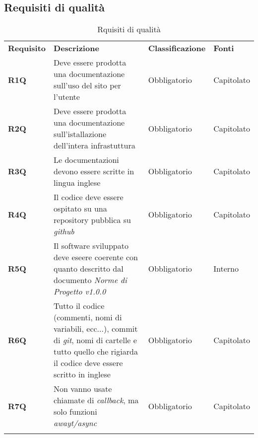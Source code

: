 \newpage
\subsection{Requisiti di qualità}
\begin{center}
    \centering
    \renewcommand{\arraystretch}{1.8}
    \label{tab:RequisitiQualita}
    \begin{longtable}[!h]{p{50px} p{200px} p{100px} p{50px}}
        \rowcolor{logo!70} \textbf{Requisito} & \textbf{Descrizione}                                                                                                                                                 & \textbf{Classificazione} & \textbf{Fonti} \\
        \textbf{R1Q}                          & Deve essere prodotta una documentazione sull'uso del sito per l'utente                                                                                               & Obbligatorio             & Capitolato     \\
        \textbf{R2Q}                          & Deve essere prodotta una documentazione sull'istallazione dell'intera infrastuttura                                                                                  & Obbligatorio             & Capitolato     \\
        \textbf{R3Q}                          & Le documentazioni devono essere scritte in lingua inglese                                                                                                            & Obbligatorio             & Capitolato     \\
        \textbf{R4Q}                          & Il codice deve essere ospitato su una repository pubblica su \textit{github}                                                                                         & Obbligatorio             & Capitolato     \\
        \textbf{R5Q}                          & Il software sviluppato deve eseere coerente con quanto descritto dal documento \textit{Norme di Progetto v1.0.0}                                                     & Obbligatorio             & Interno        \\
        \textbf{R6Q}                          & Tutto il codice (commenti, nomi di variabili, ecc...), commit di \textit{git}, nomi di cartelle e tutto quello che rigiarda il codice deve essere scritto in inglese & Obbligatorio             & Capitolato     \\
        \textbf{R7Q}                          & Non vanno usate chiamate di \textit{callback}, ma solo funzioni \textit{awayt/async}                                                                                 & Obbligatorio             & Capitolato     \\
        \rowcolor{white}\caption{Rquisiti di qualità}
    \end{longtable}
\end{center}

